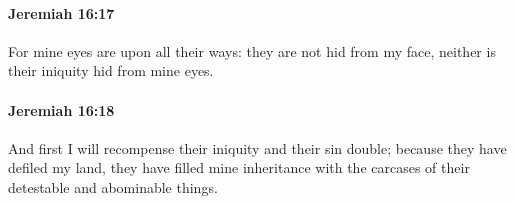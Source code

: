 		\paragraph{Jeremiah 16:17} %
			\label{JEREMIAH-16-17}

			For mine eyes are upon all their ways: they are not hid from my face, neither is their iniquity hid from mine eyes.


		\paragraph{Jeremiah 16:18} %
			\label{JEREMIAH-16-18}

			And first I will recompense their iniquity and their sin double; because they have defiled my land, they have filled mine inheritance with the carcases of their detestable and abominable things.


